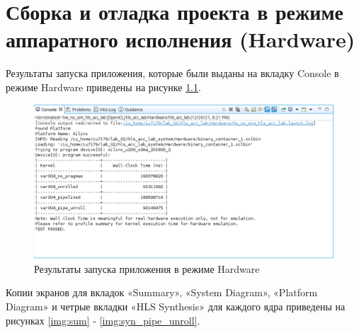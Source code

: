 \documentclass[12pt]{report}
\begin{document}
\chapter{Сборка и отладка проекта в режиме аппаратного исполнения (Hardware)}
Результаты запуска приложения, которые были выданы на вкладку Console в режиме Hardware приведены на рисунке \ref{img:test_hw}.

\begin{figure}[h!p]
	\centering
	\includegraphics[width = \linewidth]{test_hw.png}
	\caption{Результаты запуска приложения в режиме Hardware}
	\label{img:test_hw}
\end{figure}
\newpage
Копии экранов для вкладок «Summary», «System Diagram», «Platform Diagram» и четрые вкладки «HLS Synthesis» для каждого ядра приведены на рисунках \ref{img:sum} - \ref{img:syn_pipe_unroll}.
\end{document}
